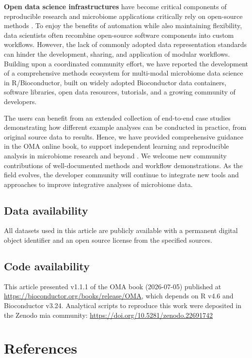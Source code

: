 \documentclass[
  sn-nature,
]{sn-jnl}
\begin{document}
\textbf{Open data science infrastructures} have become critical
components of reproducible research and microbiome applications
critically rely on open-source methods
\citep{berg2020, barker2022, hocquet2024}. To enjoy the benefits of
automation while also maintaining flexibility, data scientists often
recombine open-source software components into custom workflows.
However, the lack of commonly adopted data representation standards can
hinder the development, sharing, and application of modular workflows.
Building upon a coordinated community effort, we have reported the
development of a comprehensive methods ecosystem for multi-modal
microbiome data science in R/Bioconductor, built on widely adopted
Bioconductor data containers, software libraries, open data resources,
tutorials, and a growing community of developers.

The users can benefit from an extended collection of end-to-end case
studies demonstrating how different example analyses can be conducted in
practice, from original source data to results. Hence, we have provided
comprehensive guidance in the OMA online book, to support independent
learning and reproducible analysis in microbiome research and beyond
\citep{timmis2024, drnevich2025}. We welcome new community contributions
of well-documented methods and workflow demonstrations. As the field
evolves, the developer community will continue to integrate new tools
and approaches to improve integrative analyses of microbiome data.

\subsection{Data availability}\label{data-availability}

All datasets used in this article are publicly available with a
permanent digital object identifier and an open source license from the
specified sources.

\subsection{Code availability}\label{code-availability}

This article presented v1.1.1 of the OMA book (2026-07-05) published at
\url{https://bioconductor.org/books/release/OMA}, which depends on R
v4.6 and Bioconductor v3.24. Analytical scripts to reproduce this work
were deposited in the Zenodo mia community:
\url{https://doi.org/10.5281/zenodo.22691742}

\section{References}\label{references}
\end{document}
